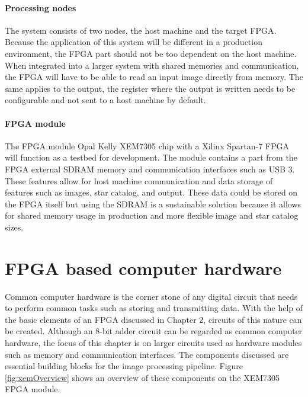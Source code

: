 \documentclass[12pt]{report}
\begin{document}
\subsubsection{Processing nodes}
The system consists of two nodes, the host machine and the target FPGA. Because the application of this system will be different in a production environment, the FPGA part should not be too dependent on the host machine. When integrated into a larger system with shared memories and communication, the FPGA will have to be able to read an input image directly from memory. The same applies to the output, the register where the output is written needs to be configurable and not sent to a host machine by default.

\subsubsection{FPGA module}
The FPGA module Opal Kelly XEM7305 chip with a Xilinx Spartan-7 FPGA will function as a testbed for development. The module contains a part from the FPGA external SDRAM memory and communication interfaces such as USB 3. These features allow for host machine communication and data storage of features such as images, star catalog, and output. These data could be stored on the FPGA itself but using the SDRAM is a sustainable solution because it allows for shared memory usage in production and more flexible image and star catalog sizes.


\chapter{FPGA based computer hardware}
Common computer hardware is the corner stone of any digital circuit that needs to perform common tasks such as storing and transmitting data. With the help of the basic elements of an FPGA discussed in Chapter 2, circuits of this nature can be created. Although an 8-bit adder circuit can be regarded as common computer hardware, the focus of this chapter is on larger circuits used as hardware modules such as memory and communication interfaces. The components discussed are essential building blocks for the image processing pipeline. Figure \ref{fig:xemOverview} shows an overview of these components on the XEM7305 FPGA module.
\end{document}
